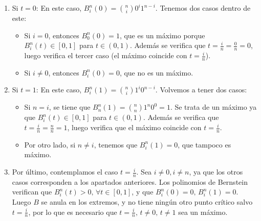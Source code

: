 \documentclass[12pt,a4paper]{article}
\begin{document}
\begin{enumerate}
\item Si $t=0$: En este caso, $B_i^n(0)=\binom{n}{i}0^i 1^{n-i}$. Tenemos
  dos casos dentro de este:
  \begin{itemize}
  \item Si $i=0$, entonces $B_0^n(0)=1$, que es un
	máximo porque $B_i^n(t)\in \left [ 0,1 \right ]$ para $t\in (0,1)$.
	Además se verifica que $t=\frac{i}{n}=\frac{0}{n}=0$, luego verifica el
	tercer caso (el máximo coincide con $t=\frac{i}{n}$).
  \item Si $i\neq 0$, entonces $B_i^n(0)=0$, que no es un máximo.
  \end{itemize}
\item Si $t=1$: En este caso, $B_i^n(1)=\binom{n}{i}1^i 0^{n-i}$. Volvemos
  a tener dos casos:
  \begin{itemize}
  \item Si $n=i$, se tiene que $B_n^n(1) = \binom{n}{n} 1^n 0^0 = 1$. Se trata de
	un máximo ya que $B_i^n(t) \in \left [ 0,1 \right ]$ para $t\in
	(0,1)$. Además se verifica que $t=\frac{i}{n}=\frac{n}{n} = 1$, luego
	verifica que el máximo coincide con $t=\frac{i}{n}$.
  \item Por otro lado, si $n \neq i$, tenemos que $B_i^n(1) = 0$, que tampoco es máximo.
  \end{itemize}
\item Por último, contemplamos el caso $t=\frac{i}{n}$. Sea $i \neq 0, i
  \neq n$, ya que los otros casos corresponden a los apartados
  anteriores. Los polinomios de Bernstein verifican que $ B_{i}^{n}(t)
  > 0,\,\forall t \in [0,1]$, y que $B_{i}^{n}(0) = 0,\,
  B_{i}^{n}(1)=0$. Luego $B$ se anula en los extremos, y no tiene ningún otro punto
  crítico salvo $t=\frac{i}{n}$, por lo que es necesario que
  $t=\frac{i}{n},\,t\neq 0,\,t \neq1$ sea un máximo.

\end{enumerate}
\end{document}
